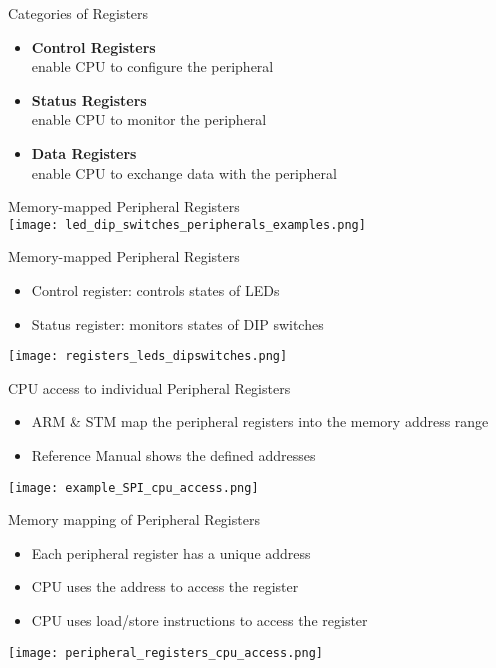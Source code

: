 \begin{theorem}{Categories of Registers}
    \begin{itemize}
        \item \textbf{Control Registers} \\
        enable CPU to configure the peripheral
        \item \textbf{Status Registers} \\
        enable CPU to monitor the peripheral
        \item \textbf{Data Registers} \\
        enable CPU to exchange data with the peripheral
    \end{itemize}
\end{theorem}

\begin{examplecode}{Memory-mapped Peripheral Registers}\\
\texttt{[image: led\_dip\_switches\_peripherals\_examples.png]}
\end{examplecode}

\begin{definition}{Memory-mapped Peripheral Registers}
    \begin{itemize}
        \item Control register: controls states of LEDs
        \item Status register: monitors states of DIP switches
    \end{itemize}
    \vspace{1mm}
    \texttt{[image: registers\_leds\_dipswitches.png]}
\end{definition}

\multend

\begin{concept}{CPU access to individual Peripheral Registers}
    \begin{itemize}
        \item ARM \& STM map the peripheral registers into
        the memory address range
        \item Reference Manual shows the defined addresses
    \end{itemize}
    \vspace{2mm}
    \texttt{[image: example\_SPI\_cpu\_access.png]}
\end{concept}


\begin{definition}{Memory mapping of Peripheral Registers}
    \begin{itemize}
        \item Each peripheral register has a unique address
        \item CPU uses the address to access the register
        \item CPU uses load/store instructions to access the register
    \end{itemize}
    \texttt{[image: peripheral\_registers\_cpu\_access.png]}
\end{definition}


